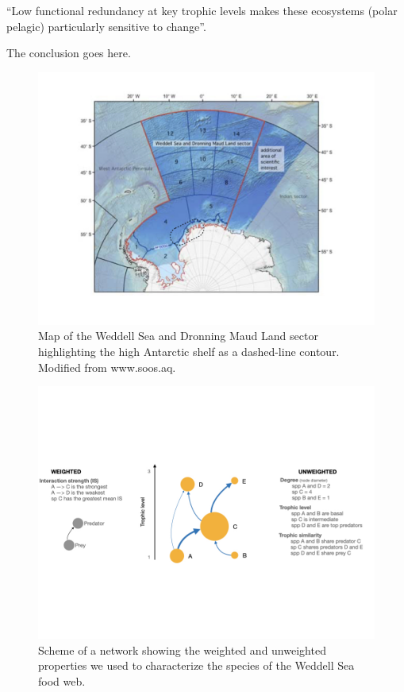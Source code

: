 \documentclass[gc, manuscript]{copernicus}
\begin{document}
``Low functional redundancy at key trophic levels makes these ecosystems
(polar pelagic) particularly sensitive to change''. \citep{Murphy2016}

\clearpage
\conclusions[Conclusions]

The conclusion goes here.

\clearpage

\begin{figure}
\includegraphics[width=12cm]{Fig.1_StudyMap} \caption{Map of the Weddell Sea and Dronning Maud Land sector highlighting the high Antarctic shelf as a dashed-line contour. Modified from www.soos.aq.}\label{fig:unnamed-chunk-1}
\end{figure}

\clearpage

\begin{figure}
\includegraphics[width=12cm]{Fig.2_ToyFoodWeb} \caption{Scheme of a network showing the weighted and unweighted properties we used to characterize the species of the Weddell Sea food web.}\label{fig:unnamed-chunk-2}
\end{figure}
\end{document}
